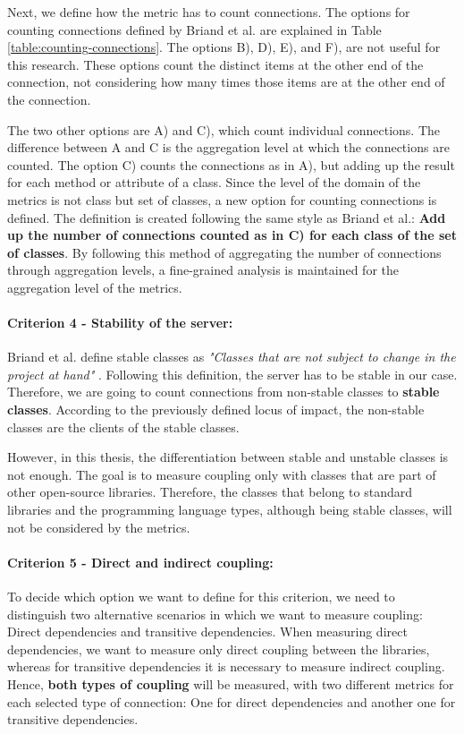 Next, we define how the metric has to count connections. The options for counting connections defined by Briand et al. \cite{briand1999unified} are explained in Table \ref{table:counting-connections}. The options B), D), E), and F), are not useful for this research. These options count the distinct items at the other end of the connection, not considering how many times those items are at the other end of the connection.

The two other options are A) and C), which count individual connections. The difference between A and C is the aggregation level at which the connections are counted. The option C) counts the connections as in A), but adding up the result for each method or attribute of a class. Since the level of the domain of the metrics is not class but set of classes, a new option for counting connections is defined. The definition is created following the same style as Briand et al.: \textbf{Add up the number of connections counted as in C) for each class of the set of classes}. By following this method of aggregating the number of connections through aggregation levels, a fine-grained analysis is maintained for the aggregation level of the metrics.

\paragraph{Criterion 4 - Stability of the server:}
Briand et al. define stable classes as \textit{"Classes that are not subject to change in the project at hand"} \cite{briand1999unified}. Following this definition, the server has to be stable in our case. Therefore, we are going to count connections from non-stable classes to \textbf{stable classes}. According to the previously defined locus of impact, the non-stable classes are the clients of the stable classes.

However, in this thesis, the differentiation between stable and unstable classes is not enough. The goal is to measure coupling only with classes that are part of other open-source libraries. Therefore, the classes that belong to standard libraries and the programming language types, although being stable classes, will not be considered by the metrics.

\paragraph{Criterion 5 - Direct and indirect coupling:}
To decide which option we want to define for this criterion, we need to distinguish two alternative scenarios in which we want to measure coupling: Direct dependencies and transitive dependencies. When measuring direct dependencies, we want to measure only direct coupling between the libraries, whereas for transitive dependencies it is necessary to measure indirect coupling. Hence, \textbf{both types of coupling} will be measured, with two different metrics for each selected type of connection: One for direct dependencies and another one for transitive dependencies.


